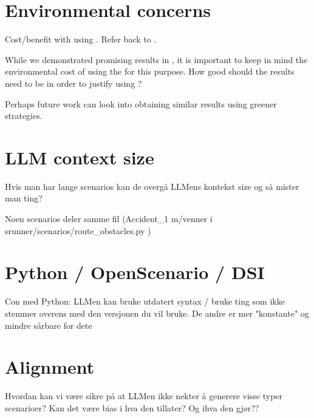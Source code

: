\section{Environmental concerns}
Cost/benefit with using . Refer back to .

While we demonstrated promising results in , it is important to keep in mind the
environmental cost of using the  for this purpose. How good should the results need
to be in order to justify using ?

Perhaps future work can look into obtaining similar results using greener strategies.



\section{LLM context size}

Hvis man har lange scenarios kan de overgå LLMens kontekst size og så mister man ting?

Noen scenarios deler samme fil (Accident\_1 m/venner i srunner/scenarios/route\_obstacles.py )

\section{Python / OpenScenario / DSI}

Con med Python: LLMen kan bruke utdatert syntax / bruke ting som ikke stemmer overens med den
versjonen du vil bruke. De andre er mer "konstante" og mindre sårbare for dete

\section{Alignment}

Hvordan kan vi være sikre på at LLMen ikke nekter å generere visse typer scenarioer? Kan det være
bias i hva den tillater? Og ihva den gjør??